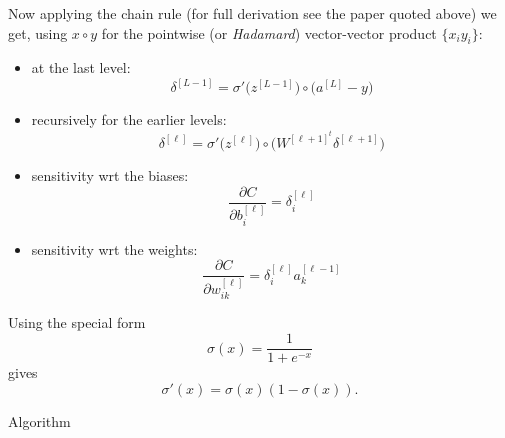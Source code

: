 Now applying the chain rule
(for full derivation see the paper quoted above)
we get,
using $x\circ y$ for the pointwise
(or \emph{Hadamard})
vector-vector product $\{ x_iy_i \}$:
\begin{itemize}
\item at the last level:
  \[ \delta^{[L-1]} = \sigma'\bigl( z^{[L-1]} \bigr) \circ \bigl( a^{[L]}-y \bigr)  \]
\item recursively for the earlier levels:
  \[ \delta^{[\ell]} = \sigma'\bigl( z^{[\ell]} \bigr) \circ
  \bigl( W^{[\ell +1]^t} \delta^{[\ell+1]} \bigr) \]
\item sensitivity wrt the biases:
  \[ \frac{\partial C}{\partial b^{[\ell]}_i} = \delta^{[\ell]}_i \]
\item sensitivity wrt the weights:
  \[ \frac{\partial C}{\partial w^{[\ell]}_{ik}} = \delta^{[\ell]}_i a^{[\ell-1]}_k \]
\end{itemize}

Using the special form \[ \sigma(x)=\frac{1}{1+e^{-x}} \]
gives \[ \sigma'(x) = \sigma(x)(1-\sigma(x)).\]

 {Algorithm}

